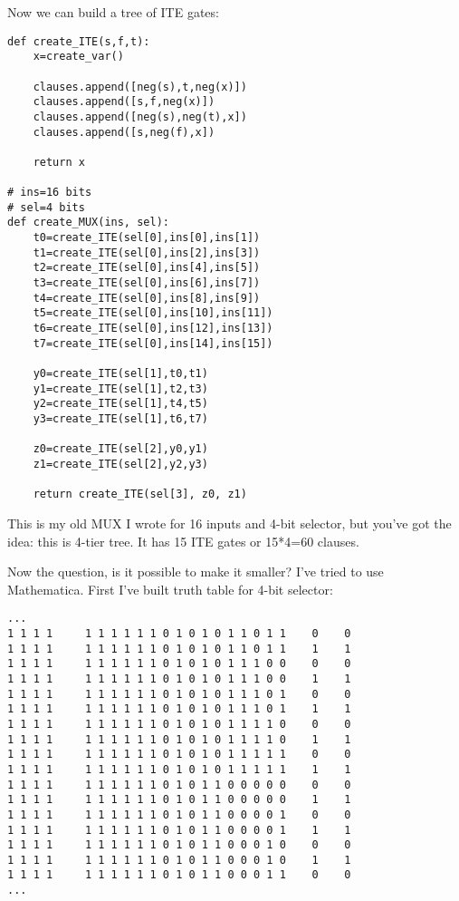 Now we can build a tree of ITE gates:

\begin{lstlisting}
def create_ITE(s,f,t):
    x=create_var()

    clauses.append([neg(s),t,neg(x)])
    clauses.append([s,f,neg(x)])
    clauses.append([neg(s),neg(t),x])
    clauses.append([s,neg(f),x])

    return x

# ins=16 bits
# sel=4 bits
def create_MUX(ins, sel):
    t0=create_ITE(sel[0],ins[0],ins[1])
    t1=create_ITE(sel[0],ins[2],ins[3])
    t2=create_ITE(sel[0],ins[4],ins[5])
    t3=create_ITE(sel[0],ins[6],ins[7])
    t4=create_ITE(sel[0],ins[8],ins[9])
    t5=create_ITE(sel[0],ins[10],ins[11])
    t6=create_ITE(sel[0],ins[12],ins[13])
    t7=create_ITE(sel[0],ins[14],ins[15])

    y0=create_ITE(sel[1],t0,t1)
    y1=create_ITE(sel[1],t2,t3)
    y2=create_ITE(sel[1],t4,t5)
    y3=create_ITE(sel[1],t6,t7)

    z0=create_ITE(sel[2],y0,y1)
    z1=create_ITE(sel[2],y2,y3)

    return create_ITE(sel[3], z0, z1)
\end{lstlisting}

This is my old MUX I wrote for 16 inputs and 4-bit selector, but you've got the idea: this is 4-tier tree.
It has 15 ITE gates or 15*4=60 clauses.

Now the question, is it possible to make it smaller?
I've tried to use Mathematica.
First I've built truth table for 4-bit selector:

\begin{lstlisting}
...
1 1 1 1     1 1 1 1 1 1 0 1 0 1 0 1 1 0 1 1    0    0
1 1 1 1     1 1 1 1 1 1 0 1 0 1 0 1 1 0 1 1    1    1
1 1 1 1     1 1 1 1 1 1 0 1 0 1 0 1 1 1 0 0    0    0
1 1 1 1     1 1 1 1 1 1 0 1 0 1 0 1 1 1 0 0    1    1
1 1 1 1     1 1 1 1 1 1 0 1 0 1 0 1 1 1 0 1    0    0
1 1 1 1     1 1 1 1 1 1 0 1 0 1 0 1 1 1 0 1    1    1
1 1 1 1     1 1 1 1 1 1 0 1 0 1 0 1 1 1 1 0    0    0
1 1 1 1     1 1 1 1 1 1 0 1 0 1 0 1 1 1 1 0    1    1
1 1 1 1     1 1 1 1 1 1 0 1 0 1 0 1 1 1 1 1    0    0
1 1 1 1     1 1 1 1 1 1 0 1 0 1 0 1 1 1 1 1    1    1
1 1 1 1     1 1 1 1 1 1 0 1 0 1 1 0 0 0 0 0    0    0
1 1 1 1     1 1 1 1 1 1 0 1 0 1 1 0 0 0 0 0    1    1
1 1 1 1     1 1 1 1 1 1 0 1 0 1 1 0 0 0 0 1    0    0
1 1 1 1     1 1 1 1 1 1 0 1 0 1 1 0 0 0 0 1    1    1
1 1 1 1     1 1 1 1 1 1 0 1 0 1 1 0 0 0 1 0    0    0
1 1 1 1     1 1 1 1 1 1 0 1 0 1 1 0 0 0 1 0    1    1
1 1 1 1     1 1 1 1 1 1 0 1 0 1 1 0 0 0 1 1    0    0
...
\end{lstlisting}

